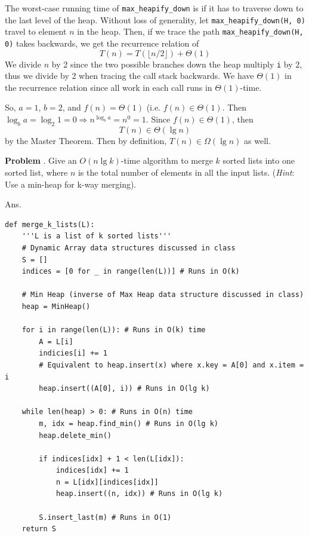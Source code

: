 \documentclass[11pt]{article}
\newcounter{problem}
\newcommand{\problem}[1]{
    \refstepcounter{problem}
    \noindent\textbf{Problem \theproblem}. #1
}
\theoremstyle{claim}
\newcommand{\answer}[1]{
    \noindent Ans. #1
}
\begin{document}
\noindent
The worst-case running time of \texttt{max\_heapify\_down} is if it has to traverse down to the last level of the heap. Without loss of generality, let \texttt{max\_heapify\_down(H, 0)} travel to element \(n\) in the heap. Then, if we trace the path \texttt{max\_heapify\_down(H, 0)} takes backwards, we get the recurrence relation of
\[T(n) = T(\lfloor n/2 \rfloor) + \Theta(1)\]
We divide \(n\) by 2 since the two possible branches down the heap multiply \texttt{i} by 2, thus we divide by 2 when tracing the call stack backwards. We have  \(\Theta(1)\) in the recurrence relation since all work in each call runs in \(\Theta(1)\)-time.

\noindent
So, \(a = 1\), \(b = 2\), and \(f(n) = \Theta(1)\) (i.e. \(f(n) \in \Theta(1)\). Then \(\log_b a = \log_2 1 = 0 \Rightarrow n^{\log_b a} = n^0 = 1\). Since \(f(n) \in \Theta(1)\), then
\[T(n) \in \Theta(\lg n)\]
by the Master Theorem. Then by definition, \(T(n) \in \Omega(\lg n)\) as well.

\pagebreak

\problem{%
    Give an \(O(n \lg k)\)-time algorithm to merge \(k\) sorted lists into one sorted list, where \(n\) is the total number of elements in all the input lists. (\emph{Hint}: Use a min-heap for k-way merging).
}

\answer{}
\begin{listing}[h]
\centering
\begin{verbatim}
def merge_k_lists(L):
    '''L is a list of k sorted lists'''
    # Dynamic Array data structures discussed in class
    S = []
    indices = [0 for _ in range(len(L))] # Runs in O(k)

    # Min Heap (inverse of Max Heap data structure discussed in class)
    heap = MinHeap()

    for i in range(len(L)): # Runs in O(k) time
        A = L[i]
        indicies[i] += 1
        # Equivalent to heap.insert(x) where x.key = A[0] and x.item = i
        heap.insert((A[0], i)) # Runs in O(lg k)

    while len(heap) > 0: # Runs in O(n) time
        m, idx = heap.find_min() # Runs in O(lg k)
        heap.delete_min()
        
        if indices[idx] + 1 < len(L[idx]):
            indices[idx] += 1
            n = L[idx][indices[idx]]
            heap.insert((n, idx)) # Runs in O(lg k)

        S.insert_last(m) # Runs in O(1)
    return S
\end{verbatim}
\end{listing}
\end{document}
